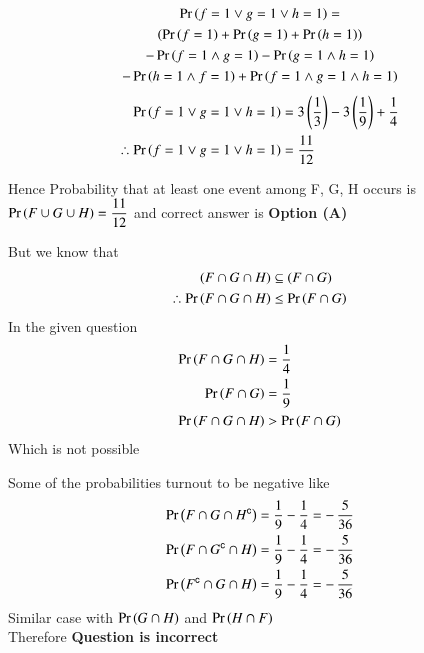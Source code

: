 \documentclass[journal,12pt,twocolumn]{IEEEtran}
\begin{document}
\begin{multline*}
\Pr\left(f=1 \lor g=1 \lor h=1\right) =  \\
\left(\Pr\left(f=1\right) + \Pr\left(g=1\right) + \Pr\left(h=1\right)\right) \\
- \Pr\left(f=1 \land g=1\right) - \Pr\left(g=1 \land h=1\right) \\
 - \Pr\left(h=1 \land f=1\right) + \Pr\left(f=1 \land g=1 \land h=1\right)
\end{multline*}
\begin{align*}
\Pr\left(f=1 \lor g=1 \lor h=1\right) &= 3\left(\dfrac{1}{3}\right) - 3\left(\dfrac{1}{9}\right) + \dfrac{1}{4} \\
\therefore \Pr\left(f=1 \lor g=1 \lor h=1\right) &= \dfrac{11}{12}
\end{align*}

Hence Probability that at least one event among F, G, H occurs is $\Pr\left(F \cup G \cup H\right)=\dfrac{11}{12}$ and correct answer is \textbf{Option (A)}
\null \par \null 
But we know that 
\begin{align*}
(F \cap G \cap H) &\subseteq (F \cap G) \\
\therefore \Pr\left(F \cap G \cap H\right) &\leq \Pr\left(F \cap G\right) 
\end{align*}
In the given question 
\begin{align*}
\Pr\left(F \cap G \cap H\right) &= \dfrac{1}{4} \\
\Pr\left(F \cap G\right)        &= \dfrac{1}{9} \\
\Pr\left(F \cap G \cap H\right) &> \Pr\left(F \cap G\right)
\end{align*}
Which is not possible

\newpage

Some of the probabilities turnout to be negative like 
\begin{align*}
\Pr\left(F \cap G \cap H^{\mathsf{c}}\right) &= \dfrac{1}{9} - \dfrac{1}{4} = -\,\dfrac{5}{36} \\
\Pr\left(F \cap G^{\mathsf{c}} \cap H\right) &= \dfrac{1}{9} - \dfrac{1}{4} = -\,\dfrac{5}{36} \\
\Pr\left(F^{\mathsf{c}} \cap G \cap H\right) &= \dfrac{1}{9} - \dfrac{1}{4} = -\,\dfrac{5}{36} 
\end{align*}
Similar case with $\Pr\left(G \cap H\right)$ and $\Pr\left(H \cap F\right)$ \\
Therefore \textbf{Question is incorrect}
\end{document}
